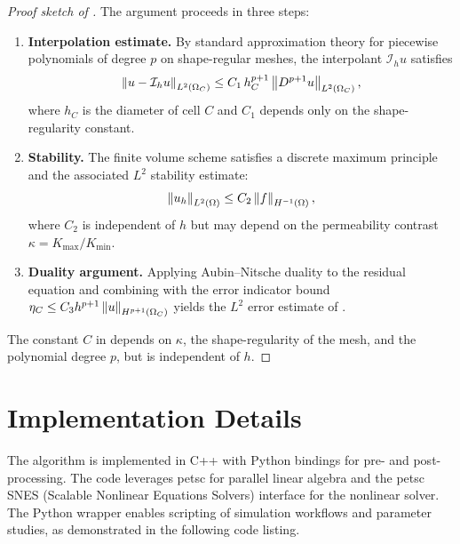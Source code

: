 \begin{proof}[Proof sketch of ]
The argument proceeds in three steps:

\begin{enumerate}
    \item \textbf{Interpolation estimate.} By standard approximation theory for piecewise polynomials of degree $p$ on shape-regular meshes, the interpolant $\mathcal{I}_h u$ satisfies
    \begin{equation}
        \left\| u - \mathcal{I}_h u \right\|_{L^2(\Omega_C)} \leq C_1 \, h_C^{p+1} \left\| D^{p+1} u \right\|_{L^2(\Omega_C)},
        \label{eq:proof_interp}
    \end{equation}
    where $h_C$ is the diameter of cell $C$ and $C_1$ depends only on the shape-regularity constant.

    \item \textbf{Stability.} The finite volume scheme satisfies a discrete maximum principle and the associated $L^2$ stability estimate:
    \begin{equation}
        \left\| u_h \right\|_{L^2(\Omega)} \leq C_2 \left\| f \right\|_{H^{-1}(\Omega)},
        \label{eq:proof_stability}
    \end{equation}
    where $C_2$ is independent of $h$ but may depend on the permeability contrast $\kappa = K_{\max}/K_{\min}$.

    \item \textbf{Duality argument.} Applying Aubin--Nitsche duality to the residual equation and combining with the error indicator bound $\eta_C \leq C_3 h^{p+1} \left\| u \right\|_{H^{p+1}(\Omega_C)}$ yields the $L^2$ error estimate of .
\end{enumerate}

The constant $C$ in  depends on $\kappa$, the shape-regularity of the mesh, and the polynomial degree $p$, but is independent of $h$.
\end{proof}

\section{Implementation Details}
\label{sec:methodology:implementation}

The algorithm is implemented in C++ with Python bindings for pre- and post-processing. The code leverages \gls{petsc} for parallel linear algebra and the \gls{petsc} SNES (Scalable Nonlinear Equations Solvers) interface for the nonlinear solver. The Python wrapper enables scripting of simulation workflows and parameter studies, as demonstrated in the following code listing.


